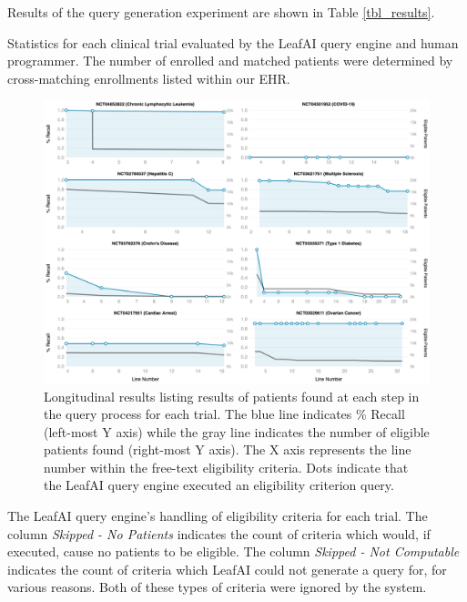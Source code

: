 \documentclass[../main.tex]{subfiles}
\begin{document}
Results of the query generation experiment are shown in Table \ref{tbl_results}.

\begin{table}[h!]
    \small
    \centering
    
    \caption{Statistics for each clinical trial evaluated by the LeafAI query engine and human programmer. The number of enrolled and matched patients were determined by cross-matching enrollments listed within our EHR.}
    \label{tbl_results}
\end{table} 

\begin{figure}[h!]
  \includegraphics[scale=0.42]{figures/leafai_detail_results_longitudinal.png}  
\caption{Longitudinal results listing results of patients found at each step in the query process for each trial. The blue line indicates \% Recall (left-most Y axis) while the gray line indicates the number of eligible patients found (right-most Y axis). The X axis represents the line number within the free-text eligibility criteria. Dots indicate that the LeafAI query engine executed an eligibility criterion query.}
\label{fig_leafai_results_longitudinal}
\end{figure}

\begin{table}[h!]
    \small
    \centering
    
    \caption{The LeafAI query engine's handling of eligibility criteria for each trial. The column \textit{Skipped - No Patients} indicates the count of criteria which would, if executed, cause no patients to be eligible. The column \textit{Skipped - Not Computable} indicates the count of criteria which LeafAI could not generate a query for, for various reasons. Both of these types of criteria were ignored by the system.}
    \label{tbl_results_leafai_detail}
\end{table} 
\end{document}
